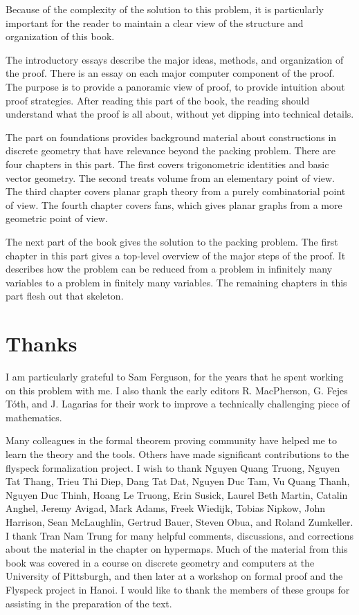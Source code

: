 Because of the complexity of the solution to this problem, it is particularly important for the reader to maintain a clear view of the structure and organization of this book. 


The introductory essays describe the major ideas,  methods, and organization of the proof.  There is an essay on each major computer component of the proof. The purpose is to provide a panoramic view of proof, to provide intuition about proof strategies.  After reading this part of the book, the reading should understand what the proof is all about, without yet dipping into technical details.  

The part on foundations provides background material about constructions in discrete geometry that have relevance beyond the packing problem.  There are four chapters in this part.  The first covers trigonometric identities and basic vector geometry.  The second treats volume from an elementary point of view.  The third chapter covers planar graph theory from a purely combinatorial point of view.  The fourth chapter covers fans, which gives planar graphs from a more geometric point of view.

The next part of the book gives the solution to the packing problem.  The first chapter in this part gives a top-level overview of the major steps of the proof.  It describes how the problem can be reduced from a problem in infinitely many variables to a problem in finitely many variables.  The remaining chapters in this part flesh out that skeleton.






\section{Thanks}

I am particularly grateful to Sam Ferguson, for the years that
he spent working on this problem with me.  I also thank the early editors
R. MacPherson, G. Fejes T\'oth, and J. Lagarias for their work
to improve a technically challenging piece of mathematics.  

Many colleagues in the formal theorem proving community have helped me to learn the theory and the tools.  Others have made significant contributions to the flyspeck formalization project.  I wish to thank 
Nguyen Quang Truong, %
Nguyen Tat Thang, %
Trieu Thi Diep, Dang Tat Dat, Nguyen Duc Tam, Vu Quang Thanh, Nguyen Duc Thinh,  Hoang Le Truong,
Erin Susick, Laurel Beth Martin, Catalin Anghel,
Jeremy Avigad, Mark Adams, Freek Wiedijk,  Tobias Nipkow, John Harrison, Sean McLaughlin, Gertrud Bauer, Steven Obua, and Roland Zumkeller.   
 I thank Tran Nam Trung for many helpful comments, discussions, and corrections about the material in the chapter on hypermaps.
Much of the material from this book was covered in a course on discrete geometry and computers at the University of Pittsburgh, and then later at a workshop on formal proof and the Flyspeck project in Hanoi.  I would like to thank the members of these groups for assisting in the preparation of the text.

